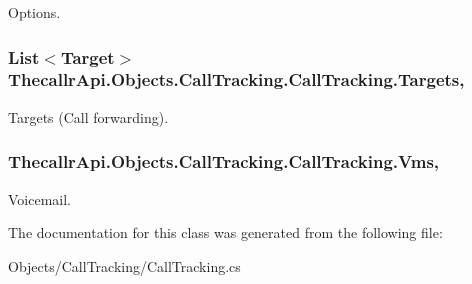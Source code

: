 Options. 

\hypertarget{class_thecallr_api_1_1_objects_1_1_call_tracking_1_1_call_tracking_a0299f3d96fb5b3e741cfdc6500c92265}{
\subsubsection[{Targets}]{\setlength{\rightskip}{0pt plus 5cm}List$<${\bf Target}$>$ Thecallr\+Api.\+Objects.\+Call\+Tracking.\+Call\+Tracking.\+Targets\hspace{0.3cm}{\ttfamily [get]}, {\ttfamily [set]}}}\label{class_thecallr_api_1_1_objects_1_1_call_tracking_1_1_call_tracking_a0299f3d96fb5b3e741cfdc6500c92265}


Targets (Call forwarding). 

\hypertarget{class_thecallr_api_1_1_objects_1_1_call_tracking_1_1_call_tracking_aa0565ab6abac5be0e4fa1667c37af58b}{
\subsubsection[{Vms}]{ Thecallr\+Api.\+Objects.\+Call\+Tracking.\+Call\+Tracking.\+Vms\hspace{0.3cm}{\ttfamily [get]}, {\ttfamily [set]}}}\label{class_thecallr_api_1_1_objects_1_1_call_tracking_1_1_call_tracking_aa0565ab6abac5be0e4fa1667c37af58b}


Voicemail. 



The documentation for this class was generated from the following file\+:\begin{DoxyCompactItemize}
\item 
Objects/\+Call\+Tracking/Call\+Tracking.\+cs\end{DoxyCompactItemize}
